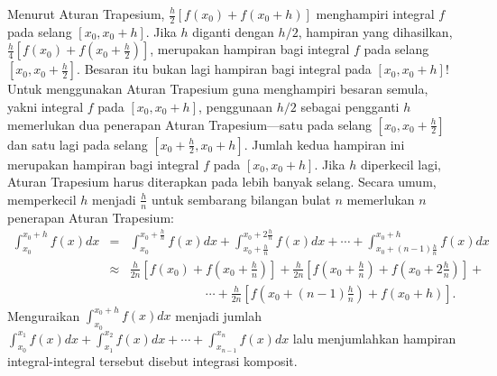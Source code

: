 Menurut Aturan Trapesium, $\frac{h}{2}\left[f(x_{0})+f(x_{0}+h)\right]$
menghampiri integral $f$ pada selang $[x_{0},x_{0}+h]$. Jika $h$
diganti dengan $h/2$, hampiran yang dihasilkan, $\frac{h}{4}\left[f(x_{0})+f(x_{0}+\frac{h}{2})\right]$,
merupakan hampiran bagi integral $f$ pada selang $[x_{0},x_{0}+\frac{h}{2}]$.
Besaran itu bukan lagi hampiran bagi integral pada $[x_{0},x_{0}+h]$!
Untuk menggunakan Aturan Trapesium guna menghampiri besaran semula,
yakni integral $f$ pada $[x_{0},x_{0}+h]$, penggunaan $h/2$ sebagai
pengganti $h$ memerlukan dua penerapan Aturan Trapesium---satu pada
selang $[x_{0},x_{0}+\frac{h}{2}]$ dan satu lagi pada selang $[x_{0}+\frac{h}{2},x_{0}+h]$.
Jumlah kedua hampiran ini merupakan hampiran bagi integral $f$ pada
$[x_{0},x_{0}+h]$. Jika $h$ diperkecil lagi, Aturan Trapesium harus
diterapkan pada lebih banyak selang. Secara umum, memperkecil $h$
menjadi $\frac{h}{n}$ untuk sembarang bilangan bulat $n$ memerlukan
$n$ penerapan Aturan Trapesium:
\begin{eqnarray}
\int_{x_{0}}^{x_{0}+h}f(x)dx & = & \int_{x_{0}}^{x_{0}+\frac{h}{n}}f(x)dx+\int_{x_{0}+\frac{h}{n}}^{x_{0}+2\frac{h}{n}}f(x)dx+\cdots+\int_{x_{0}+(n-1)\frac{h}{n}}^{x_{0}+h}f(x)dx\nonumber \\
 & \approx & \frac{h}{2n}\left[f(x_{0})+f\left(x_{0}+\frac{h}{n}\right)\right]+\frac{h}{2n}\left[f\left(x_{0}+\frac{h}{n}\right)+f\left(x_{0}+2\frac{h}{n}\right)\right]+\nonumber \\
 &  & \qquad\qquad\qquad\cdots+\frac{h}{2n}\left[f\left(x_{0}+(n-1)\frac{h}{n}\right)+f(x_{0}+h)\right].\label{eq:compositeTrapezoidal}
\end{eqnarray}
Menguraikan $\int_{x_{0}}^{x_{0}+h}f(x)dx$ menjadi jumlah $\int_{x_{0}}^{x_{1}}f(x)dx+\int_{x_{1}}^{x_{2}}f(x)dx+\cdots+\int_{x_{n-1}}^{x_{n}}f(x)dx$
lalu menjumlahkan hampiran integral-integral tersebut disebut integrasi
komposit.

